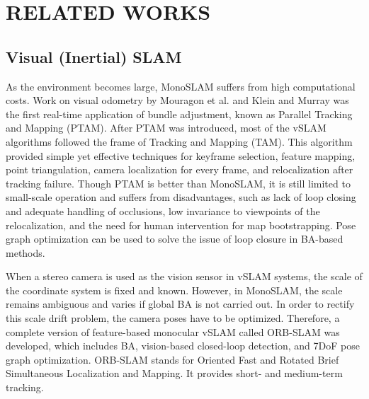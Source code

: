 \documentclass[letterpaper, 10 pt, conference]{ieeeconf}  %
\begin{document}

\section{RELATED WORKS}


\subsection{Visual (Inertial) SLAM}
As the environment becomes large, MonoSLAM suffers from high computational costs. Work on visual odometry by Mouragon et al. \cite{Mouragon} and Klein and Murray \cite{Klein} was the first real-time application of bundle adjustment, known as Parallel Tracking and Mapping (PTAM). After PTAM was introduced, most of the vSLAM algorithms followed the frame of Tracking and Mapping (TAM). This algorithm provided simple yet effective techniques for keyframe selection, feature mapping, point triangulation, camera localization for every frame, and relocalization after tracking failure. Though PTAM is better than MonoSLAM, it is still limited to small-scale operation and suffers from disadvantages, such as lack of loop closing and adequate handling of occlusions, low invariance to viewpoints of the relocalization, and the need for human intervention for map bootstrapping. Pose graph optimization can be used to solve the issue of loop closure in BA-based methods.

When a stereo camera is used as the vision sensor in vSLAM systems, the scale of the coordinate system is fixed and known. However, in MonoSLAM, the scale remains ambiguous and varies if global BA is not carried out. In order to rectify this scale drift problem, the camera poses have to be optimized. Therefore, a complete version of feature-based monocular vSLAM called ORB-SLAM \cite{7} was developed, which includes BA, vision-based closed-loop detection, and 7DoF pose graph optimization. ORB-SLAM stands for Oriented Fast and Rotated Brief Simultaneous Localization and Mapping. It provides short- and medium-term tracking.
\end{document}
